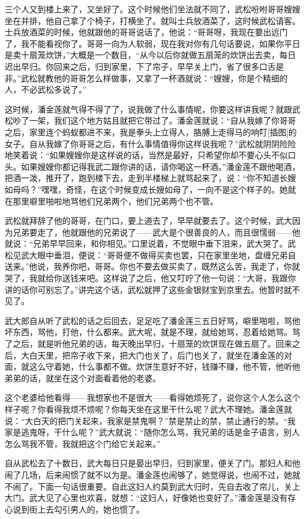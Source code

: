 \par 三个人又到楼上来了，又坐好了。这个时候他们坐法就不同了，武松吩咐哥哥嫂嫂坐在并排，他自己拿了个椅子，打横坐了。就叫士兵放酒菜了，这时候武松请客。士兵放酒菜的时候，他就跟他的哥哥说话了，他说：“哥哥呀，我现在要出远门了，我不能看视你了。哥哥一向为人软弱，现在我对你有几句话要说，如果你平日是卖十扇笼炊饼，”大概是一个数目，“从今以后你就做五扇笼的炊饼出去卖，每日迟出早归。你回来之后，归到家里，下了帘子，早早关上门，省了很多口舌是非。”武松就教他的哥哥怎么样做事，又拿了一杯酒就说：“嫂嫂，你是个精细的人，不必武松多说了。”
\par 这时候，潘金莲就气得不得了了，说我做了什么事情呢，你要这样讲我呢？就跟武松吵了一架，我们这个地方姑且就把它带过了。潘金莲就说：“自从我嫁了你哥哥之后，家里连个蚂蚁都进不来，我是拳头上立得人，胳膊上走得马的响叮[插图]的女子。自从我嫁了你哥哥之后，有什么事情值得你这样说我呢？”武松就阴阴险险地笑着说：“如果嫂嫂你是这样说的话，当然是最好，只希望你却不要心头不似口头。如果嫂嫂你都记得我武二跟你讲的话，请你喝这一杯酒。”潘金莲不跟他喝酒，把酒一泼，推开了，跑到楼下去，走到半楼梯上就骂起来了，说：“你不知道长嫂如母吗？”嘿嘿，奇怪，在这个时候变成长嫂如母了，一向不是这个样子的。她就在那里噼里啪啦地骂他们兄弟两个，他们兄弟两个也不管。
\par 武松就拜辞了他的哥哥，在门口，要上道去了，早早就要去了。这个时候，武大因为兄弟要走了，他就跟他的兄弟说了——武大是个很善良的人，而且很懦弱——他就说：“兄弟早早回来，和你相见。”口里说着，不觉眼中垂下泪来，武大哭了。武松见武大眼中垂泪，便说：“哥哥便不做得买卖也罢，只在家里坐地，盘缠兄弟自送来。”他说，我养你吧，哥哥。你也不要去做买卖了，既然这么苦，我走了，你就哭了，我就给你送钱来吧。这样说了之后，他又叮咛了他一句说：“大哥，我跟你讲的话你可别忘了。”讲完这个话，武松就押了这些金银财宝到京里去。他暂时就不见了。
\par 武大郎自从听了武松的话之后回去，足足吃了潘金莲三五日好骂，噼里啪啦，骂他坏东西，骂他，打他，什么都来。武大呢，就是不理，就给她骂，忍着给她骂。骂了之后，就是听他兄弟的话，每天晚出早归，十扇笼的炊饼现在做五扇了。回来之后，大白天里，把帘子收下来，把大门也关了，后门也关了，就坐在潘金莲的对面，就这么守着她，什么事都不做。炊饼生意好不好，钱赚不赚，他不管，他听他弟弟的话，就坐在这个对面看着他的老婆。
\par 这个老婆给他看得——我想家也不是很大——看得她烦死了，说你这个人怎么这个样子呢？你看得我烦不烦呢？你每天坐在这里干什么呢？武大不理她。潘金莲就说：“大白天的把门关起来，我家是禁鬼啊？”禁是禁止的禁，禁止通行的禁。“我家是逃鬼呀，干什么呢？”武大就说：“随你怎么骂，我兄弟的话是金子语言，别人怎么骂我不管，我就把这个门给它关起来。”
\par 自从武松去了十数日，武大每日只是晏出早归，归到家里，便关了门。那妇人和他闹了几场，后来闹惯了就不以为是。潘金莲也闹够了，她觉得说，也闹不过，她就不闹了。下面一句话很重要。自此这妇人约莫到武大归时，先自去收了帘儿，关上大门。武大见了心里也欢喜，就想：“这妇人，好像她也变好了。”潘金莲是没有存心说到街上去勾引男人的，她也惯了。
